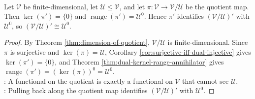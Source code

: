 \begin{corollary} \label{cor:quotient-dual-annihilator-isomorphism} \\
Let $\mathcal{V}$ be finite-dimensional, let $\mathcal{U}\leq\mathcal{V}$, and let $\pi:\mathcal{V}\to\mathcal{V}/\mathcal{U}$ be the quotient map.\\
Then $\ker(\pi')=\{0\}$ and $\operatorname{range}(\pi')=\mathcal{U}^0$. Hence $\pi'$ identifies $(\mathcal{V}/\mathcal{U})'$ with $\mathcal{U}^0$, so $(\mathcal{V}/\mathcal{U})'\cong\mathcal{U}^0$.
\begin{proof}
By Theorem \ref{thm:dimension-of-quotient}, $\mathcal{V}/\mathcal{U}$ is finite-dimensional. Since $\pi$ is surjective and $\ker(\pi)=\mathcal{U}$, Corollary \ref{cor:surjective-iff-dual-injective} gives $\ker(\pi')=\{0\}$, and Theorem \ref{thm:dual-kernel-range-annihilator} gives $\operatorname{range}(\pi')=(\ker(\pi))^0=\mathcal{U}^0$.\\
: A functional on the quotient is exactly a functional on $\mathcal{V}$ that cannot see $\mathcal{U}$.\\
: Pulling back along the quotient map identifies $(\mathcal{V}/\mathcal{U})'$ with $\mathcal{U}^0$.
\end{proof}
\end{corollary}

